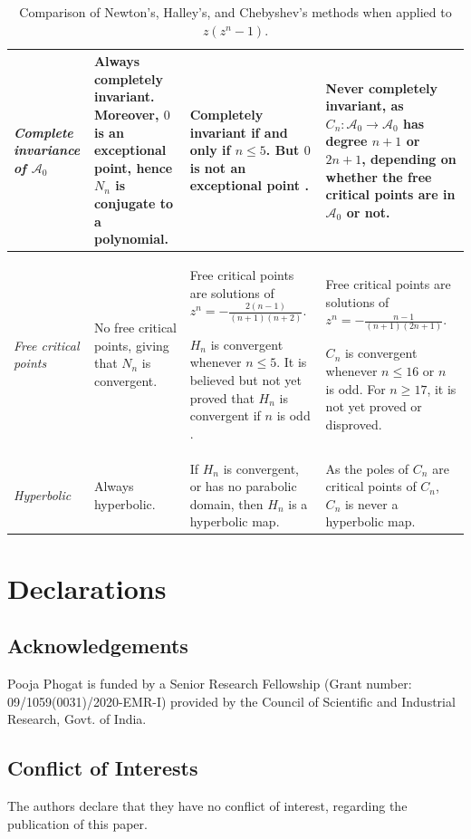 \documentclass[12pt]{article}
\begin{document}
\begin{table}[htbp]
\begin{tabular}{|p{2.25cm}| p{4.25cm}| p{4.25cm}| p{4.25cm}|}
		\hline
		\textsl{Complete invariance of   $\mathcal{A}_0$} &
		Always completely invariant. Moreover, $0$ is an exceptional point, hence  $N_n$ is conjugate to a polynomial. &
		Completely invariant if and only if $n \le 5$. But $0$ is not an exceptional point \cite[Proposition~3.6]{CGJ2025}. &
		Never completely invariant, as $C_n: \mathcal{A}_0 \to \mathcal{A}_0 $ has degree $n+1$ or $2n+1$, depending on whether the free critical points are in $\mathcal{A}_0$ or not.\\
		\hline
		\textsl{Free critical points} &
		No free critical points, giving that $N_n$ is convergent. &
		Free critical points are solutions of $z^n = -\frac{2(n-1)}{(n+1)(n+2)}.$ 
		\par $H_n$ is convergent whenever $n \leq 5$. It is believed but not yet proved that $H_n$ is convergent if $n$ is odd \cite[Theorem~B]{halley-liu-etal-2025}. &
		Free critical points are solutions of $z^n = -\frac{n-1}{(n+1)(2n+1)}.$ 
		\par $C_n$ is convergent whenever $n \leq 16$ or $n$ is odd. For $n \geq 17$, it is not yet proved or disproved. \\
		\hline
		\textsl{Hyperbolic} &
		Always hyperbolic. &   If $H_n$ is convergent, or has no parabolic domain, then $H_n$ is a hyperbolic map. &
		As the poles of $C_n$ are critical points of $C_n$, $C_n$ is never a hyperbolic map. \\
		\hline
	\end{tabular}
	\caption{Comparison of Newton's, Halley's, and Chebyshev's methods when applied to $z(z^n -1)$.}
	\label{tab:methods_comparison}
\end{table}
 

	\section*{Declarations}
	\subsection*{Acknowledgements}  Pooja Phogat is funded by a Senior Research Fellowship (Grant number: 09/1059(0031)/2020-EMR-I) provided by the Council of Scientific and Industrial Research, Govt. of India.  
	
	\subsection*{Conflict of Interests}
	The authors declare that they have no conflict of interest, regarding the publication of this paper.
	
\end{document}
